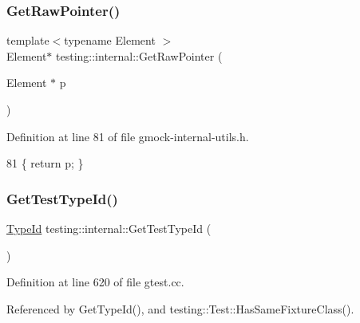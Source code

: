 \subsubsection{\texorpdfstring{Get\+Raw\+Pointer()}{GetRawPointer()}\hspace{0.1cm}{\footnotesize\ttfamily [2/2]}}
{\footnotesize\ttfamily template$<$typename Element $>$ \\
Element$\ast$ testing\+::internal\+::\+Get\+Raw\+Pointer (\begin{DoxyParamCaption}\item[{Element $\ast$}]{p }\end{DoxyParamCaption})\hspace{0.3cm}{\ttfamily [inline]}}



Definition at line 81 of file gmock-\/internal-\/utils.\+h.


\begin{DoxyCode}
81 \{ \textcolor{keywordflow}{return} p; \}
\end{DoxyCode}
\mbox{\label{namespacetesting_1_1internal_ad0d66d56ead224263cd100c1d6bfc562}} 
\subsubsection{\texorpdfstring{Get\+Test\+Type\+Id()}{GetTestTypeId()}}
{\footnotesize\ttfamily \hyperlink{namespacetesting_1_1internal_ab1114197d3c657d8b7f8e0c5caa12d00}{Type\+Id} testing\+::internal\+::\+Get\+Test\+Type\+Id (\begin{DoxyParamCaption}{ }\end{DoxyParamCaption})}



Definition at line 620 of file gtest.\+cc.



Referenced by Get\+Type\+Id(), and testing\+::\+Test\+::\+Has\+Same\+Fixture\+Class().


